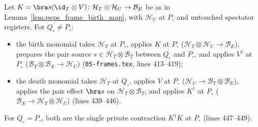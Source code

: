 \begin{definition}
    \label{def:peps_frame_birth_monomials}
    \leanok
    Let $K=\bra s(\id_T\otimes V)\colon\mathcal H_T\otimes\mathcal H_U\to\mathcal B_E$
    be as in Lemma~\ref{lem:peps_frame_birth_map}, with $\mathcal H_U$ at
    $P_\circ$ and untouched spectator registers. For $Q_\circ\neq P_\circ$:
    \begin{itemize}
        \item the birth monomial takes $\mathcal H_T$ at $P_\circ$, applies $K$
              at $P_\circ$ ($\mathcal H_T\otimes\mathcal H_U\to\mathcal B_E$),
              prepares the pair source $s\in\mathcal H_T\otimes\mathcal B_T$ between
              $Q_\circ$ and $P_\circ$, and applies $V^\dagger$ at $P_\circ$
              ($\mathcal B_T\otimes\mathcal B_E\to\mathcal H_U$)
              (\texttt{05-frames.tex}, lines 413--419);
        \item the death monomial takes $\mathcal H_T$ at $Q_\circ$, applies $V$
              at $P_\circ$ ($\mathcal H_U\to\mathcal B_T\otimes\mathcal B_E$),
              applies the pair effect $\bra s$ on $\mathcal H_T\otimes\mathcal B_T$,
              and applies $K^\dagger$ at $P_\circ$
              ($\mathcal B_E\to\mathcal H_T\otimes\mathcal H_U$) (lines 439--446).
    \end{itemize}
    For $Q_\circ=P_\circ$, both are the single private contraction
    $K^\dagger K$ at $P_\circ$ (lines 447--449).
\end{definition}


